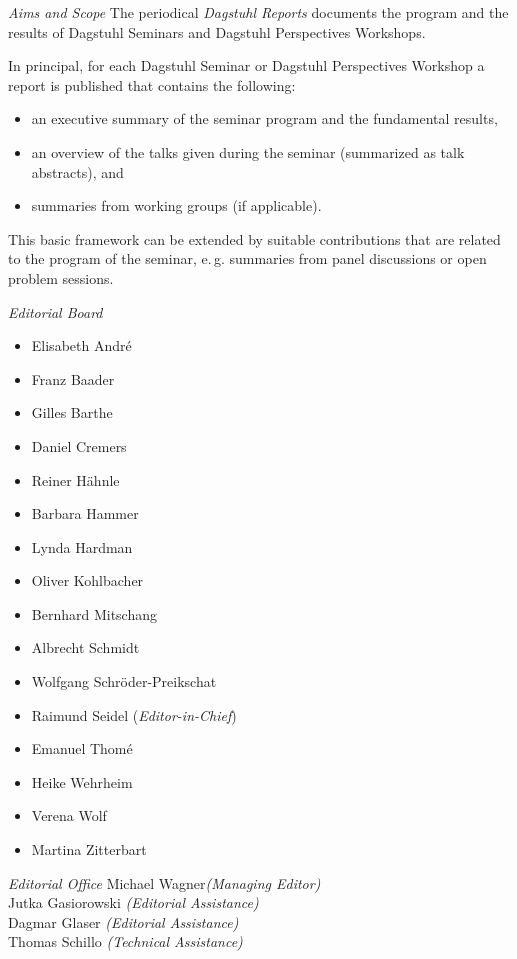 \documentclass[a4paper,USenglish]{dagrep-master-v2021}
\begin{document}
\begin{publicationinfo}
\bigskip
\bigskip


\emph{Aims and Scope}\newline
The periodical \emph{Dagstuhl Reports} documents the program and the results of Dagstuhl Seminars and Dagstuhl Perspectives Workshops.

In principal, for each Dagstuhl Seminar or Dagstuhl Perspectives Workshop a report is published that contains the following:
\begin{itemize}
\item an executive summary of the seminar program and the fundamental results,
\item an overview of the talks given during the seminar (summarized as talk abstracts), and
\item summaries from working groups (if applicable).
\end{itemize}

This basic framework can be extended by suitable contributions that are related to the program of the seminar, e.\,g. summaries from panel discussions or open problem sessions.
 
\medskip
\medskip

\emph{Editorial Board}
\begin{itemize}
\item Elisabeth Andr\'{e}
\item Franz Baader
\item Gilles Barthe
\item Daniel Cremers
\item Reiner H\"ahnle
\item Barbara Hammer
\item Lynda Hardman
\item Oliver Kohlbacher
\item Bernhard Mitschang
\item Albrecht Schmidt
\item Wolfgang Schr\"{o}der-Preikschat
\item Raimund Seidel (\emph{Editor-in-Chief})
\item Emanuel Thom\'{e}
\item Heike Wehrheim
\item Verena Wolf
\item Martina Zitterbart
\end{itemize}

\medskip
\emph{Editorial Office}\newline
Michael Wagner\emph{(Managing Editor)}\\
Jutka Gasiorowski \emph{(Editorial Assistance)}\\
Dagmar Glaser \emph{(Editorial Assistance)}\\
Thomas Schillo \emph{(Technical Assistance)}


\end{publicationinfo}
\end{document}
